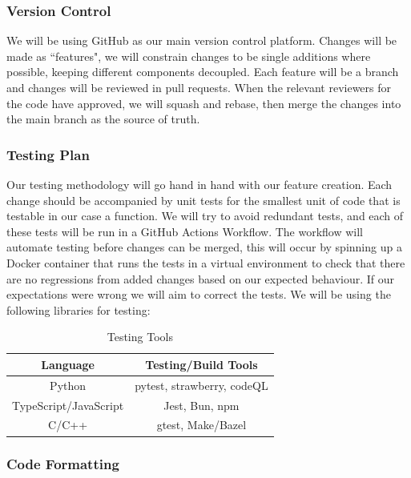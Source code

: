 \documentclass[a4]{article}
\begin{document}
\subsubsection{Version Control}

We will be using GitHub as our main version control platform. Changes will be made as “features", we will constrain changes to be single additions where possible, keeping different components decoupled.
Each feature will be a branch and changes will be reviewed in pull requests. When the relevant reviewers for the code have approved,
we will squash and rebase, then merge the changes into the main branch as the source of truth.



\subsubsection{Testing Plan}

Our testing methodology will go hand in hand with our feature creation. Each change should be accompanied by unit tests for the smallest unit of code that is testable in our case a function.
We will try to avoid redundant tests, and each of these tests will be run in a GitHub Actions Workflow. The workflow will automate testing before changes can be merged, this will occur by spinning up
a Docker container that runs the tests in a virtual environment to check that there are no regressions from added changes based on our expected behaviour. If our expectations were wrong we will aim to correct the tests. We will be using the following libraries for testing:

\begin{table}[h!]
	\centering
	\begin{tabular}{|c|c|}
		\hline
		\textcolor{McMasterMaroon}{\textbf{Language}} &
		\textcolor{McMasterMaroon}{\textbf{Testing/Build Tools}}                   \\
		\hline
		Python                                        & pytest, strawberry, codeQL \\
		\hline
		TypeScript/JavaScript                         & Jest, Bun, npm             \\
		\hline
		C/C++                                         & gtest, Make/Bazel          \\
		\hline
	\end{tabular}
	\caption{Testing Tools}
\end{table}


\subsubsection{Code Formatting}
\end{document}
